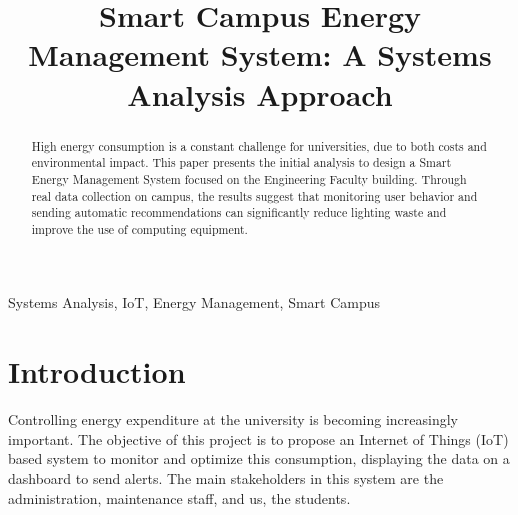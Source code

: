 \documentclass[conference]{IEEEtran}
\begin{document}
\title{Smart Campus Energy Management System: A Systems Analysis Approach}

\author{
\and
{}
\and
{}
\and
{}
}

\maketitle

\begin{abstract}
High energy consumption is a constant challenge for universities, due to both costs and environmental impact. This paper presents the initial analysis to design a Smart Energy Management System focused on the Engineering Faculty building. Through real data collection on campus, the results suggest that monitoring user behavior and sending automatic recommendations can significantly reduce lighting waste and improve the use of computing equipment.
\end{abstract}

\begin{IEEEkeywords}
Systems Analysis, IoT, Energy Management, Smart Campus
\end{IEEEkeywords}

\section{Introduction}
Controlling energy expenditure at the university is becoming increasingly important. The objective of this project is to propose an Internet of Things (IoT) based system to monitor and optimize this consumption, displaying the data on a dashboard to send alerts. The main stakeholders in this system are the administration, maintenance staff, and us, the students.
\end{document}
